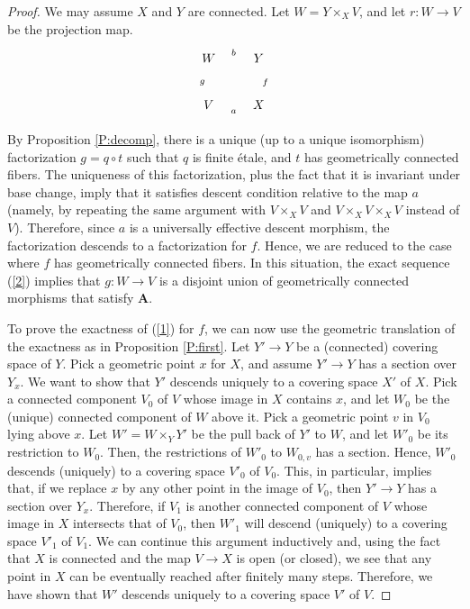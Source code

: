 \documentclass{amsart}
\theoremstyle{definition}
\theoremstyle{remark}
\theoremstyle{remark}
\newcommand{\x}{\times}
\let\:=\colon
\begin{document}
\begin{proof}
We may assume $X$ and $Y$ are connected. Let $W=Y \x_X V$, and let
$r \: W \to V$ be the projection map. $$\xymatrix{ W \ar[r]^{b}
\ar[d]_{g} & Y \ar[d]^{f} \\
             V \ar[r]_{a}        & X }$$

By Proposition \ref{P:decomp}, there is a unique (up to a unique
isomorphism) factorization $g = q \circ t$ such that $q$ is finite
\'{e}tale, and $t$ has geometrically connected fibers. The
uniqueness of this factorization, plus the fact that it is
invariant under base change, imply that it satisfies descent
condition relative to the map $a$ (namely, by repeating the same
argument with $V \x_X V$ and $V \x_X V \x_X V$ instead of $V$).
Therefore, since $a$ is a universally effective descent morphism,
the factorization descends to a factorization for $f$. Hence, we
are reduced to the case where $f$ has geometrically connected
fibers. In this situation, the exact sequence (\ref{2}) implies
that $g \: W \to V$ is a disjoint union of geometrically connected
morphisms that satisfy $\mathbf{A}$.


To prove the exactness of (\ref{1}) for $f$, we can now use the
geometric translation of the exactness as in Proposition
\ref{P:first}.
 Let $Y' \to Y$ be a (connected) covering space of $Y$. Pick a
 geometric point $x$ for $X$, and assume $Y' \to Y$
 has a section over $Y_x$. We want to show that $Y'$ descends
 uniquely to a covering space $X'$ of $X$.
Pick a connected component $V_0$ of $V$ whose image in $X$
contains $x$, and let $W_0$ be the (unique) connected component of
$W$ above it. Pick a geometric point $v$ in $V_0$ lying above $x$.
Let $W'=W \x_Y Y'$  be the pull back of $Y'$  to $W$, and let
$W'_0$ be its restriction to $W_0$. Then, the restrictions of
$W'_0$ to $W_{0,v}$ has a section. Hence, $W'_0$   descends
(uniquely) to a covering space  $V'_0$
  of $V_0$. This, in particular, implies that, if we replace $x$
  by any other point in the image of $V_0$, then $Y' \to Y$ has a
  section over $Y_x$. Therefore, if $V_1$ is another connected
  component of $V$ whose image in $X$ intersects that of $V_0$,
  then $W'_1$ will descend (uniquely) to a covering space  $V'_1$
  of $V_1$. We can continue this argument inductively and, using
  the fact that $X$ is connected and the map $V \to X$ is open (or
  closed), we see that any point in $X$ can be eventually reached
  after finitely many steps. Therefore, we have shown that $W'$
  descends uniquely to a covering space  $V'$ of $V$.


\end{proof}
\end{document}
